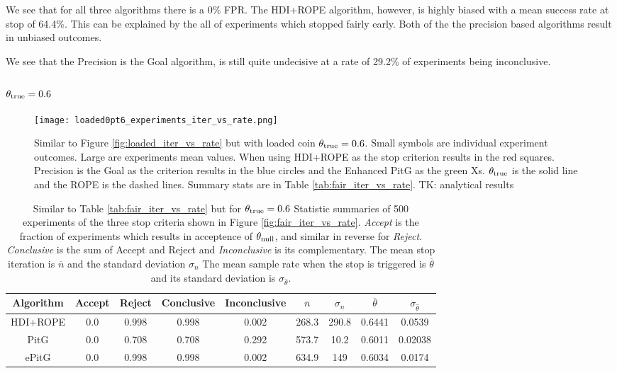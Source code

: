 We see that for all three algorithms there is a 0\% FPR.
The HDI+ROPE algorithm, however, is highly biased with a mean
success rate at stop of 64.4\%. This can be explained by the all of experiments
which stopped fairly early. Both of the the precision based algorithms result in
unbiased outcomes.

We see that the Precision is the Goal algorithm, is still quite undecisive at a rate of 29.2\%
of experiments being inconclusive.

\subsubsection{$\theta_{\rm true}=0.6$}

\begin{figure}[h!]
  \centering
  \texttt{[image: loaded0pt6\_experiments\_iter\_vs\_rate.png]}
  \caption{Similar to Figure \ref{fig:loaded_iter_vs_rate} but with
  loaded coin $\theta_{\rm true}=0.6$.
  Small symbols are individual experiment outcomes. Large are experiments
  mean values. When using HDI+ROPE as the stop criterion results in the red squares.
  Precision is the Goal as the criterion results in the blue circles
  and the Enhanced PitG as the green Xs. $\theta_{\rm true}$ is the solid line and
  the ROPE is the dashed lines. Summary stats are in Table \ref{tab:fair_iter_vs_rate}. TK: analytical results
  }
  \label{fig:loaded0pt6_iter_vs_rate}
\end{figure}


\begin{table}[h!]\label{tab:loaded0pt6_iter_vs_rate}
  \begin{center}
  \begin{tabular}{c|c|c|c|c|c|c|c|c}
    \hline
    Algorithm & Accept & Reject & Conclusive & Inconclusive & $\overline{n}$ & $\sigma_n$ & $\overline{\theta}$ & $\sigma_{\hat{\theta}}$\\
    \hline
    HDI+ROPE & 0.0	& 0.998	& 0.998 &	0.002	& 268.3 &	290.8 & 0.6441 &	0.0539 \\
    PitG & 0.0 &	0.708 &	0.708 &	0.292	& 573.7	& 10.2 &	0.6011 &	0.02038 \\
    ePitG & 0.0	& 0.998	& 0.998	& 0.002	& 634.9	& 149	& 0.6034	 & 0.0174 \\
    \hline
  \end{tabular}
  \caption{Similar to Table \ref{tab:fair_iter_vs_rate} but for $\theta_{\rm true}=0.6$ Statistic summaries of 500 experiments of the three stop criteria shown in
  Figure \ref{fig:fair_iter_vs_rate}. {\it Accept}
  is the fraction of experiments which results in acceptence of $\theta_{\rm null}$,
  and similar in reverse for {\it Reject}. {\it Conclusive} is the sum of Accept
  and Reject and {\it Inconclusive} is its complementary.
  The mean stop iteration is $\overline{n}$ and the standard deviation $\sigma_n$
  The mean sample rate when the stop is triggered is $\overline{\theta}$ and its standard deviation is $\sigma_{\hat{\theta}}$.
  }
\end{center}
\end{table}

